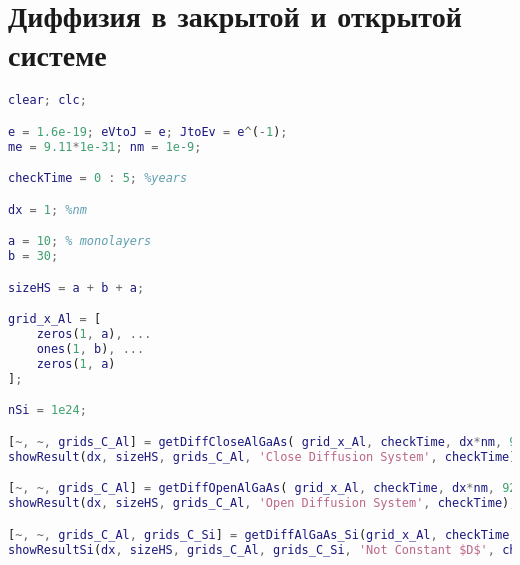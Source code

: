 \chapter{Диффизия в закрытой и открытой системе}
\label{app:Diff}
\begin{lstlisting}[style=realcode,language=Matlab,caption={Функция расчета диффузионного расплытия атомов $Al$ в <<открытой>> системе $i$-$Al_{x}Ga_{1-x}As$},label={lst:mainDiff}]
clear; clc;

e = 1.6e-19; eVtoJ = e; JtoEv = e^(-1); 
me = 9.11*1e-31; nm = 1e-9;

checkTime = 0 : 5; %years

dx = 1; %nm

a = 10; % monolayers
b = 30; 

sizeHS = a + b + a;

grid_x_Al = [
	zeros(1, a), ...
	ones(1, b), ...
	zeros(1, a)
];

nSi = 1e24;

[~, ~, grids_C_Al] = getDiffCloseAlGaAs( grid_x_Al, checkTime, dx*nm, 920 );
showResult(dx, sizeHS, grids_C_Al, 'Close Diffusion System', checkTime); %img 2.5

[~, ~, grids_C_Al] = getDiffOpenAlGaAs( grid_x_Al, checkTime, dx*nm, 920 );
showResult(dx, sizeHS, grids_C_Al, 'Open Diffusion System', checkTime); %img 2.7

[~, ~, grids_C_Al, grids_C_Si] = getDiffAlGaAs_Si(grid_x_Al, checkTime, dx*nm, 430, nSi);
showResultSi(dx, sizeHS, grids_C_Al, grids_C_Si, 'Not Constant $D$', checkTime); %img 2.9
\end{lstlisting}